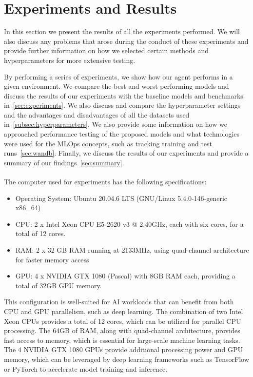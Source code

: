 \documentclass[../xlapes02]{subfiles}
\begin{document}
    \chapter{Experiments and Results}\label{ch:experiments-and-results}
    In this section we present the results of all the experiments performed. We will also discuss any problems that arose during the conduct of these experiments and provide further information on how we selected certain methods and hyperparameters for more extensive testing.

    By performing a series of experiments, we show how our agent performs in a given environment. We compare the best and worst performing models and discuss the results of our experiments with the baseline models and benchmarks in~\cref{sec:experiments}. We also discuss and compare the hyperparameter settings and the advantages and disadvantages of all the datasets used in~\cref{subsec:hyperparameters}. We also provide some information on how we approached performance testing of the proposed models and what technologies were used for the MLOps concepts, such as tracking training and test runs~\cref{sec:wandb}. Finally, we discuss the results of our experiments and provide a summary of our findings~\cref{sec:summary}.
    \\
    \\
    The computer used for experiments has the following specifications:
    \begin{itemize}
        \item Operating System: Ubuntu 20.04.6 LTS (GNU/Linux 5.4.0-146-generic x86\_64)
        \item CPU: 2 x Intel Xeon CPU E5-2620 v3 @ 2.40GHz, each with six cores, for a total of 12 cores.
        \item RAM: 2 x 32 GB RAM running at 2133MHz, using quad-channel architecture for faster memory access
        \item GPU: 4 x NVIDIA GTX 1080 (Pascal) with 8GB RAM each, providing a total of 32GB GPU memory.
    \end{itemize}
    This configuration is well-suited for AI workloads that can benefit from both CPU and GPU parallelism, such as deep learning. The combination of two Intel Xeon CPUs provides a total of 12 cores, which can be utilized for parallel CPU processing. The 64GB of RAM, along with quad-channel architecture, provides fast access to memory, which is essential for large-scale machine learning tasks. The 4 NVIDIA GTX 1080 GPUs provide additional processing power and GPU memory, which can be leveraged by deep learning frameworks such as TensorFlow or PyTorch to accelerate model training and inference.
\end{document}

